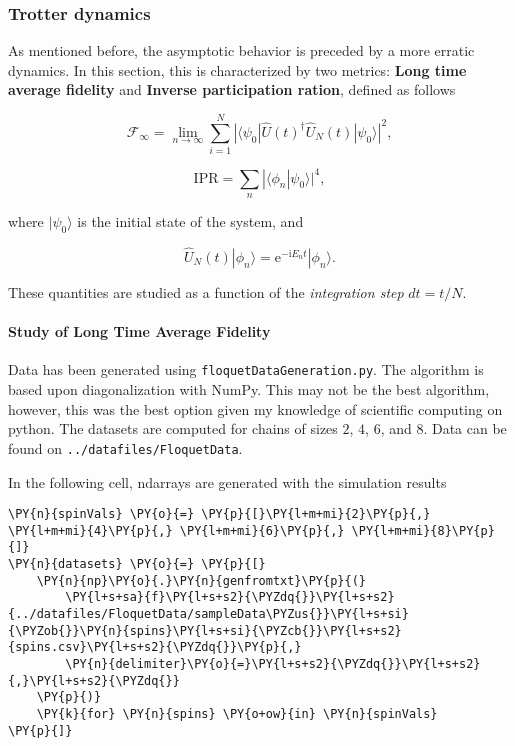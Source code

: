     
    \hypertarget{trotter-dynamics}{%
\subsubsection{Trotter dynamics}\label{trotter-dynamics}}

As mentioned before, the asymptotic behavior is preceded by a more
erratic dynamics. In this section, this is characterized by two metrics:
\textbf{Long time average fidelity} and \textbf{Inverse participation
ration}, defined as follows

\[
\mathcal{F}_{\infty} = \lim_{n \rightarrow \infty} \sum_{i = 1}^N |\langle\psi_0|\hat{U}(t)^\dagger\hat{U}_N(t)|\psi_0\rangle|^2,
\]

\[
\text{IPR} = \sum_{n} |\langle\phi_n|\psi_0\rangle|^4,
\]

\noindent where \(|\psi_0\rangle\) is the initial state of the system, and

\[
\hat{U}_N(t)|\phi_n\rangle = \mathrm{e}^{-\mathrm{i}E_n t}|\phi_n\rangle.
\]

These quantities are studied as a function of the \emph{integration
step} \(dt = t/N\).

    \hypertarget{study-of-long-time-average-fidelity}{%
\paragraph{Study of Long Time Average
Fidelity}\label{study-of-long-time-average-fidelity}}

Data has been generated using \texttt{floquetDataGeneration.py}. The
algorithm is based upon diagonalization with NumPy. This may not be the
best algorithm, however, this was the best option given my knowledge of
scientific computing on python. The datasets are computed for chains of
sizes \(2\), \(4\), \(6\), and \(8\). Data can be found on
\texttt{../datafiles/FloquetData}.

In the following cell, ndarrays are generated with the simulation
results

    \begin{tcolorbox}[breakable, size=fbox, boxrule=1pt, pad at break*=1mm,colback=cellbackground, colframe=cellborder]
\begin{Verbatim}[commandchars=\\\{\}]
\PY{n}{spinVals} \PY{o}{=} \PY{p}{[}\PY{l+m+mi}{2}\PY{p}{,} \PY{l+m+mi}{4}\PY{p}{,} \PY{l+m+mi}{6}\PY{p}{,} \PY{l+m+mi}{8}\PY{p}{]}
\PY{n}{datasets} \PY{o}{=} \PY{p}{[}
    \PY{n}{np}\PY{o}{.}\PY{n}{genfromtxt}\PY{p}{(}
        \PY{l+s+sa}{f}\PY{l+s+s2}{\PYZdq{}}\PY{l+s+s2}{../datafiles/FloquetData/sampleData\PYZus{}}\PY{l+s+si}{\PYZob{}}\PY{n}{spins}\PY{l+s+si}{\PYZcb{}}\PY{l+s+s2}{spins.csv}\PY{l+s+s2}{\PYZdq{}}\PY{p}{,}
        \PY{n}{delimiter}\PY{o}{=}\PY{l+s+s2}{\PYZdq{}}\PY{l+s+s2}{,}\PY{l+s+s2}{\PYZdq{}}
    \PY{p}{)}
    \PY{k}{for} \PY{n}{spins} \PY{o+ow}{in} \PY{n}{spinVals}
\PY{p}{]}
\end{Verbatim}
\end{tcolorbox}

